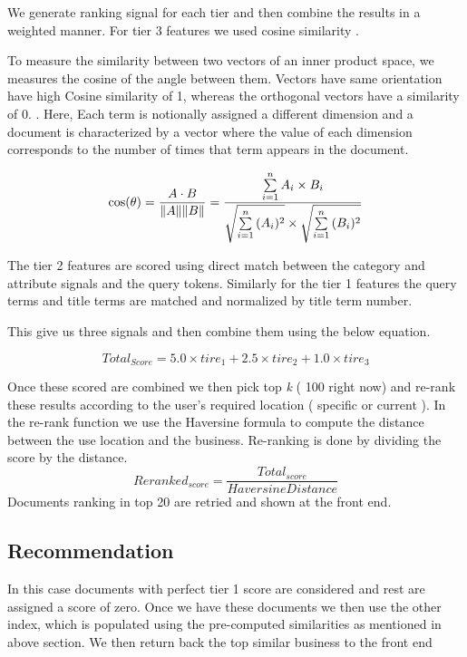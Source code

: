 \documentclass[paper=letter, fontsize=15pt]{article} %
\begin{document}
We generate ranking signal for each tier and then combine the results in a weighted manner. For tier 3 features we used cosine similarity \cite{cos}.

To measure the similarity between two vectors of an inner product space, we measures the cosine of the angle between them. Vectors have same orientation have high Cosine similarity of 1, whereas the orthogonal vectors have a similarity of 0. . Here, Each term is notionally assigned a different dimension and a document is characterized by a vector where the value of each dimension corresponds to the number of times that term appears in the document. 

\begin{equation}
\cos(\theta) = {A \cdot B \over \|A\| \|B\|} = \frac{ \sum\limits_{i=1}^{n}{A_i \times B_i} }{ \sqrt{\sum\limits_{i=1}^{n}{(A_i)^2}} \times \sqrt{\sum\limits_{i=1}^{n}{(B_i)^2}} }
\label{eq:}
\end{equation}

The tier 2 features are scored using direct match between the category and attribute signals and the query tokens. Similarly for the tier 1 features the query terms and title terms are matched and normalized by title term number.

This give us three signals and then combine them using the below equation.

\begin{equation}
Total_{Score} = 5.0 \times tire_{1} + 2.5 \times tire_{2} + 1.0 \times tire_{3}
\end{equation}

Once these scored are combined we then pick top \textit{k} ( 100 right now) and re-rank these results according to the user's required location ( specific or current ). In the re-rank function we use the Haversine formula \cite{hav} to compute the distance between the use location and the business. Re-ranking is done by dividing the score by the distance.
\begin{equation}
Reranked_{score} = \frac{Total_{score}}{HaversineDistance}
\end{equation}
Documents ranking in top 20 are retried and shown at the front end.

\subsection{Recommendation}
In this case documents with perfect tier 1 score are considered and rest are assigned a score of zero. Once we have these documents we then use the other index, which is populated using the pre-computed similarities as mentioned in above section. We then return back the top similar business to the front end
\end{document}
